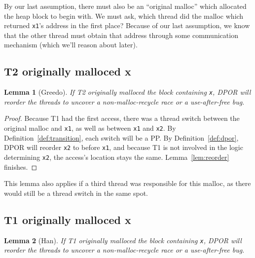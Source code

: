 \documentclass[pldi]{sigplanconf-pldi15}
\newtheorem{lemma}{Lemma}
\begin{document}
By our last assumption, there must also be an ``original malloc'' which allocated the heap block to begin with.
We must ask, which thread did the malloc which returned {\tt x1}'s address in the first place?
Because of our last assumption, we know that the other thread must obtain that address through some communication mechanism (which we'll reason about later).

\subsection{T2 originally malloced x}

\begin{lemma}[Greedo]
	If T2 originally malloced the block containing {\tt x}, DPOR will reorder the threads to uncover a non-malloc-recycle race or a use-after-free bug.
	\label{lem:greedo}
\end{lemma}
\begin{proof}
Because T1 had the first access, there was a thread switch between the original malloc and {\tt x1}, as well as between {\tt x1} and {\tt x2}. By Definition~\ref{def:transition}, each switch will be a PP.
By Definition~\ref{def:dpor}, DPOR will reorder {\tt x2} to before {\tt x1},
and because T1 is not involved in the logic determining {\tt x2}, the access's location stays the same.
Lemma~\ref{lem:reorder} finishes.
\end{proof}

This lemma also applies if a third thread was responsible for this malloc, as there would still be a thread switch in the same spot.

\subsection{T1 originally malloced x}

\begin{lemma}[Han]
	If T1 originally malloced the block containing {\tt x}, DPOR will reorder the threads to uncover a non-malloc-recycle race or a use-after-free bug.
	\label{lem:han}
\end{lemma}
\end{document}
